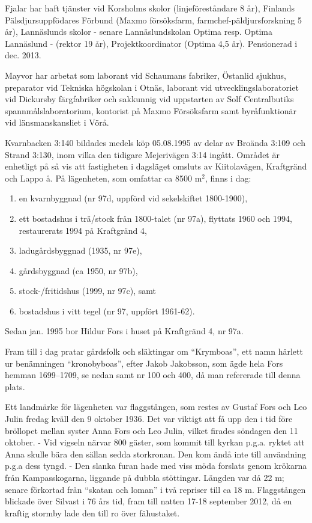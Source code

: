 Fjalar har haft tjänster vid Korsholms skolor (linjeföreståndare 8 år), Finlands Pälsdjursuppfödares Förbund (Maxmo försöksfarm, farmchef-päldjursforskning 5 år), Lannäslunds skolor - senare Lannäslundskolan Optima resp. Optima Lannäslund - (rektor 19 år), Projektkoordinator (Optima 4,5 år).	Pensionerad i dec. 2013.

Mayvor har arbetat som laborant vid Schaumans fabriker, Östanlid sjukhus, preparator vid Tekniska högskolan i Otnäs, laborant vid utvecklingslaboratoriet vid Dickursby färgfabriker och sakkunnig vid uppstarten av Solf Centralbutiks spannmålslaboratorium, kontorist på Maxmo Försöksfarm samt byråfunktionär vid länsmanskansliet i Vörå.

Kvarnbacken 3:140 bildades medels köp 05.08.1995 av delar av Broända 3:109 och Strand 3:130, inom vilka den tidigare Mejerivägen 3:14 ingått. Området är enhetligt på så vis att fastigheten i dagsläget omsluts av Kiitolavägen, Kraftgränd och Lappo å. På lägenheten, som omfattar ca 8500 m$^2$, finns i dag:
\begin{enumerate}
  \item en kvarnbyggnad (nr 97d, uppförd vid sekelskiftet 1800-1900),
  \item ett bostadshus i trä/stock från 1800-talet (nr 97a), flyttats 1960 och 1994, restaurerats 1994 på Kraftgränd 4,
  \item ladugårdsbyggnad (1935, nr 97e),
  \item gårdsbyggnad (ca 1950, nr 97b),
  \item stock-/fritidshus (1999, nr 97c), samt
  \item bostadshus i vitt tegel (nr 97, uppfört 1961-62).
\end{enumerate}

Sedan jan. 1995 bor Hildur Fors i huset på Kraftgränd 4, nr 97a.


Fram till i dag pratar gårdsfolk och släktingar om ``Krymboas'', ett namn härlett ur benämningen ``kronobyboas'', efter Jakob Jakobsson, som ägde hela Fors hemman 1699--1709, se nedan samt nr 100 och 400, då man refererade till denna plats.

Ett landmärke för lägenheten var flaggstången, som restes av Gustaf	Fors och Leo Julin fredag kväll den 9 oktober 1936. Det var viktigt att få upp den i tid före bröllopet mellan syster Anna Fors och Leo Julin, vilket firades söndagen den 11 oktober. - Vid vigseln närvar 800	gäster, som kommit till kyrkan p.g.a. ryktet att Anna skulle bära den	sällan sedda storkronan. Den kom ändå inte till användning p.g.a	dess tyngd. - Den slanka furan hade med viss möda forslats genom	krökarna från Kampasskogarna, liggande på dubbla stöttingar. Längden var då 22 m; senare förkortad från ``skatan och loman''  i två	repriser till ca 18 m. Flaggstången blickade över Silvast i 76 års tid,	fram till natten 17-18 september 2012, då en kraftig stormby lade den till ro över fähustaket.

